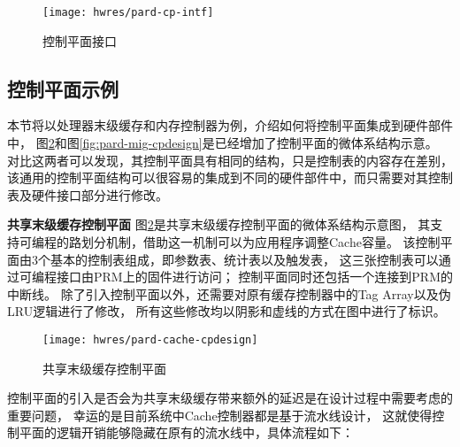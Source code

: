 \begin{figure}[tb]
  \centering
  \texttt{[image: hwres/pard-cp-intf]}
  \caption[控制平面接口]{控制平面接口}
  \label{fig:pard-cp-intf}
\end{figure}


\subsection{控制平面示例}

本节将以处理器末级缓存和内存控制器为例，介绍如何将控制平面集成到硬件部件中，
图\ref{fig:pard-cache-cpdesign}和图\ref{fig:pard-mig-cpdesign}是已经增加了控制平面的微体系结构示意。
对比这两者可以发现，其控制平面具有相同的结构，只是控制表的内容存在差别，
该通用的控制平面结构可以很容易的集成到不同的硬件部件中，而只需要对其控制表及硬件接口部分进行修改。

\textbf{共享末级缓存控制平面}\quad
图\ref{fig:pard-cache-cpdesign}是共享末级缓存控制平面的微体系结构示意图，
其支持可编程的路划分机制，借助这一机制可以为应用程序调整Cache容量。
该控制平面由3个基本的控制表组成，即参数表、统计表以及触发表，
这三张控制表可以通过可编程接口由PRM上的固件进行访问；
控制平面同时还包括一个连接到PRM的中断线。
除了引入控制平面以外，还需要对原有缓存控制器中的Tag Array以及伪LRU逻辑进行了修改，
所有这些修改均以阴影和虚线的方式在图中进行了标识。

\begin{figure}[tb]
  \centering
  \texttt{[image: hwres/pard-cache-cpdesign]}
  \caption{共享末级缓存控制平面}
  \label{fig:pard-cache-cpdesign}
\end{figure}

控制平面的引入是否会为共享末级缓存带来额外的延迟是在设计过程中需要考虑的重要问题，
幸运的是目前系统中Cache控制器都是基于流水线设计，
这就使得控制平面的逻辑开销能够隐藏在原有的流水线中，具体流程如下：

